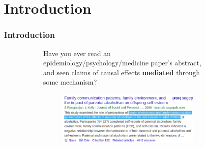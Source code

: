\documentclass[dvipsnames,handout]{beamer} %
\begin{document}
\section{Introduction}
\begin{frame}
    \frametitle{Introduction}
    \begin{figure}[h!]
        \centering
        \singlespacing
        \begin{subfigure}[c]{\textwidth}
            Have you ever read an epidemiology/psychology/medicine paper's abstract, and seen claims of causal effects \textbf{mediated} through some mechanism?
        \end{subfigure}
        \begin{subfigure}[c]{0.75\textwidth}
            \centering
            \singlespacing
            \begin{subfigure}[c]{\textwidth}
                \centering
                \includegraphics[width=\textwidth]{presentation-files/headlines/rangarajan-2006.png}
            \end{subfigure}
        \end{subfigure}
    \end{figure}
\end{frame}
\end{document}
